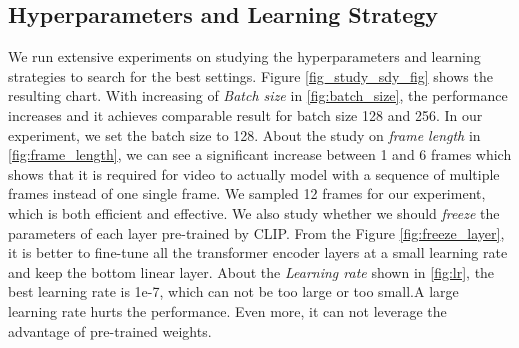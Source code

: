 \documentclass[11pt]{article}
\begin{document}
	\subsection{Hyperparameters and Learning Strategy}
	We run extensive experiments on studying the hyperparameters and learning strategies to search for the best settings. Figure \ref{fig_study_sdy_fig} shows the resulting chart. With increasing of \emph{Batch size} in \ref{fig:batch_size}, the performance increases and it achieves comparable result for batch size 128 and 256. In our experiment, we set the batch size to 128. About the study on \emph{frame length} in \ref{fig:frame_length}, we can see a significant increase between 1 and 6 frames which shows that it is required for video to actually model with a sequence of multiple frames instead of one single frame. We sampled 12 frames for our experiment, which is both efficient and effective. We also study whether we should \emph{freeze} the parameters of each layer pre-trained by CLIP. From the Figure \ref{fig:freeze_layer}, it is better to fine-tune all the transformer encoder layers at a small learning rate and keep the bottom linear layer. About the \emph{Learning rate} shown in \ref{fig:lr}, the best learning rate is 1e-7, which can not be too large or too small.A large learning rate hurts the performance. Even more, it can not leverage the advantage of pre-trained weights.
\end{document}
